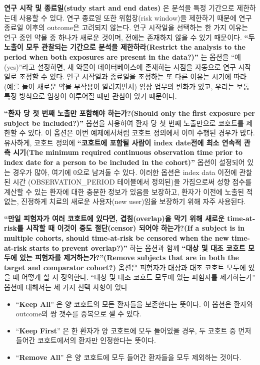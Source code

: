 \documentclass[11pt]{book}
\providecommand{\tightlist}{%
  \setlength{\itemsep}{0pt}\setlength{\parskip}{0pt}}
\theoremstyle{definition}
\theoremstyle{definition}
\theoremstyle{definition}
\theoremstyle{remark}
\begin{document}
\textbf{연구 시작 및 종료일(study start and end dates)} 은 분석을 특정
기간으로 제한하는데 사용할 수 있다. 연구 종료일 또한 위험창(risk
window)을 제한하기 때문에 연구 종료일 이후의 outcome은 고려되지 않는다.
연구 시작일을 선택하는 한 가지 이유는 연구 중인 약물 중 하나가 새로운
것이며, 전에는 존재하지 않을 수 있기 때문이다. \textbf{``두 노출이 모두
관찰되는 기간으로 분석을 제한하라(Restrict the analysis to the period
when both exposures are present in the data?)''} 는 옵션을
``예(yes)''라고 설정하면, 새 약물이 데이터베이스에 존재하는 시점을
자동으로 연구 시작일로 조정할 수 있다. 연구 시작일과 종료일을 조정하는
또 다른 이유는 시기에 따라 (예를 들어 새로운 약물 부작용이 알려지면서)
임상 업무의 변화가 있고, 우리는 보통 특정 방식으로 임상이 이루어질 때만
관심이 있기 때문이다.

\textbf{``환자 당 첫 번째 노출만 포함해야 하는가?(Should only the first
exposure per subject be included?)''} 옵션을 사용하여 환자 당 첫 번째
노출만으로 코호트를 제한할 수 있다. 이 옵션은 이번 예제에서처럼 코호트
정의에서 이미 수행된 경우가 많다. 유사하게, 코호트 정의에
\textbf{``코호트에 포함될 사람이 index date전에 최소 연속적 관측
시기(The minimum required continuous observation time prior to index
date for a person to be included in the cohort)''} 옵션이 설정되어 있는
경우가 많아, 여기에 0으로 남겨둘 수 있다. 이러한 옵션은 index data
이전에 관찰된 시간 (OBSERVATION\_PERIOD 테이블에서 정의된)을 가짐으로써
성향 점수를 계산할 수 있는 환자에 대한 충분한 정보가 있음을 보장하고,
환자가 이전에 노출된 적 없는, 진정하게 치료의 새로운 사용자(new
user)임을 보장하기 위해 자주 사용된다.

\textbf{``만일 피험자가 여러 코호트에 있다면, 겹침(overlap)을 막기 위해
새로운 time-at-risk를 시작할 때 이것이 중도 절단(censor) 되어야
하는가?(If a subject is in multiple cohorts, should time-at-risk be
censored when the new time-at-risk starts to prevent overlap?)''} 하는
옵션과 함께 \textbf{``대상 및 대조 코호트 모두에 있는 피험자를
제거하는가?''(Remove subjects that are in both the target and comparator
cohort?)} 옵션은 피험자가 대상과 대조 코호트 모두에 있을 때 어떻게 할 지
정의한다. ``대상 및 대조 코호트 모두에 있는 피험자를 제거하는가'' 옵션에
대해서는 세 가지 선택 사항이 있다

\begin{itemize}
\tightlist
\item
  ``\textbf{Keep All}'' 은 양 코호트의 모든 환자들을 보존한다는 뜻이다.
  이 옵션은 환자와 outcome의 쌍 갯수를 중복으로 셀 수 있다.
\item
  ``\textbf{Keep First}'' 은 한 환자가 양 코호트에 모두 들어있을 경우,
  두 코호트 중 먼저 들어간 코호트에서의 환자만 인정한다는 뜻이다.
\item
  ``\textbf{Remove All}'' 은 양 코호트에 모두 들어간 환자들을 모두
  제외하는 것이다.
\end{itemize}
\end{document}
